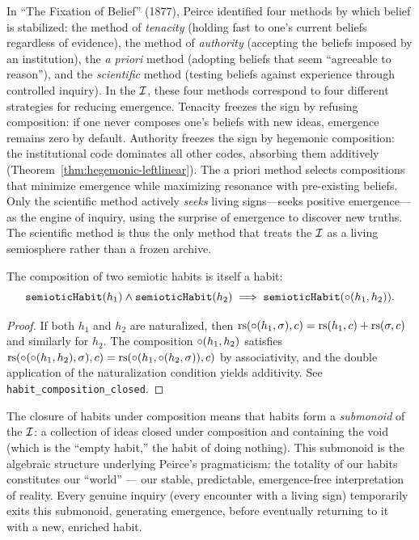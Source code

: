 \begin{remark}
In ``The Fixation of Belief'' (1877), Peirce identified four methods by which belief is stabilized: the method of \emph{tenacity} (holding fast to one's current beliefs regardless of evidence), the method of \emph{authority} (accepting the beliefs imposed by an institution), the \emph{a priori} method (adopting beliefs that seem ``agreeable to reason''), and the \emph{scientific} method (testing beliefs against experience through controlled inquiry). In the $\mathcal{I}$, these four methods correspond to four different strategies for reducing emergence. Tenacity freezes the sign by refusing composition: if one never composes one's beliefs with new ideas, emergence remains zero by default. Authority freezes the sign by hegemonic composition: the institutional code dominates all other codes, absorbing them additively (Theorem~\ref{thm:hegemonic-leftlinear}). The a priori method selects compositions that minimize emergence while maximizing resonance with pre-existing beliefs. Only the scientific method actively \emph{seeks} living signs---seeks positive emergence---as the engine of inquiry, using the surprise of emergence to discover new truths. The scientific method is thus the only method that treats the $\mathcal{I}$ as a living semiosphere rather than a frozen archive.
\end{remark}

\begin{theorem}
\label{thm:habit-composition}
The composition of two semiotic habits is itself a habit:
\[
  \texttt{semioticHabit}(h_1) \wedge \texttt{semioticHabit}(h_2)
  \implies \texttt{semioticHabit}(\circ(h_1, h_2)).
\]
\end{theorem}

\begin{proof}
If both $h_1$ and $h_2$ are naturalized, then
$\mathrm{rs}(\circ(h_1, \sigma), c) = \mathrm{rs}(h_1, c) + \mathrm{rs}(\sigma, c)$ and
similarly for $h_2$. The composition $\circ(h_1, h_2)$ satisfies
$\mathrm{rs}(\circ(\circ(h_1, h_2), \sigma), c)
= \mathrm{rs}(\circ(h_1, \circ(h_2, \sigma)), c)$ by associativity,
and the double application of the naturalization condition yields
additivity. See \texttt{habit\_composition\_closed}.
\end{proof}

\begin{interpretation}
The closure of habits under composition means that habits form a
\emph{submonoid} of the $\mathcal{I}$: a collection of ideas closed under
composition and containing the void (which is the ``empty habit,''
the habit of doing nothing). This submonoid is the algebraic
structure underlying Peirce's pragmaticism: the totality of our
habits constitutes our ``world'' --- our stable, predictable,
emergence-free interpretation of reality. Every genuine inquiry
(every encounter with a living sign) temporarily exits this
submonoid, generating emergence, before eventually returning to
it with a new, enriched habit.
\end{interpretation}

